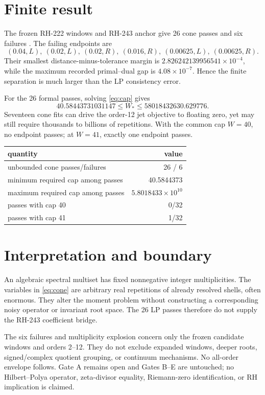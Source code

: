 \documentclass[11pt]{article}
\begin{document}
\section{Finite result}

The frozen RH-222 windows and RH-243 anchor give 26 cone passes and six
failures \citep{WangRH222,WangRH243}.  The failing endpoints are
\[
 (0.04,L),\ (0.02,L),\ (0.02,R),\ (0.016,R),\
 (0.00625,L),\ (0.00625,R).
\]
Their smallest distance-minus-tolerance margin is
$2.826242139956541\times10^{-4}$, while the maximum recorded primal--dual
gap is $4.08\times10^{-7}$.  Hence the finite separation is much larger than
the LP consistency error.

For the 26 formal passes, solving \eqref{eq:cap} gives
\[
 40.58443731031147\le W_*
 \le58018432630.629776.
\]
Seventeen cone fits can drive the order-12 jet objective to floating zero,
yet may still require thousands to billions of repetitions.  With the common
cap $W=40$, no endpoint passes; at $W=41$, exactly one endpoint passes.

\begin{center}
\small
\begin{tabular}{lr}
\toprule
quantity & value\\
\midrule
unbounded cone passes/failures & 26 / 6\\
minimum required cap among passes & 40.5844373\\
maximum required cap among passes & $5.8018433\times10^{10}$\\
passes with cap 40 & 0/32\\
passes with cap 41 & 1/32\\
\bottomrule
\end{tabular}
\end{center}

\section{Interpretation and boundary}

An algebraic spectral multiset has fixed nonnegative integer multiplicities.
The variables in \eqref{eq:cone} are arbitrary real repetitions of already
resolved shells, often enormous.  They alter the moment problem without
constructing a corresponding noisy operator or invariant root space.  The 26
LP passes therefore do not supply the RH-243 coefficient bridge.

The six failures and multiplicity explosion concern only the frozen
candidate windows and orders 2--12.  They do not exclude expanded windows,
deeper roots, signed/complex quotient grouping, or continuum mechanisms.  No
all-order envelope follows.  Gate A remains open and Gates B--E are untouched;
no Hilbert--Polya operator, zeta-divisor equality, Riemann-zero
identification, or RH implication is claimed.



\end{document}
